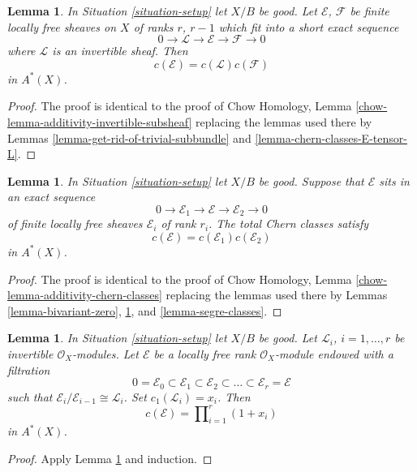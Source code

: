 \documentclass{stacks-project}
\theoremstyle{plain}
\newtheorem{lemma}[subsection]{Lemma}
\theoremstyle{definition}
\theoremstyle{remark}
\numberwithin{equation}{subsection}
\begin{document}
\begin{lemma}
\label{lemma-additivity-invertible-subsheaf}
In Situation \ref{situation-setup} let $X/B$ be good.
Let $\mathcal{E}$, $\mathcal{F}$ be finite locally free sheaves
on $X$ of ranks $r$, $r - 1$ which fit into a short
exact sequence
$$
0 \to \mathcal{L} \to \mathcal{E} \to \mathcal{F} \to 0
$$
where $\mathcal{L}$ is an invertible sheaf.
Then
$$
c(\mathcal{E}) = c(\mathcal{L}) c(\mathcal{F})
$$
in $A^*(X)$.
\end{lemma}

\begin{proof}
The proof is identical to the proof of
Chow Homology, Lemma \ref{chow-lemma-additivity-invertible-subsheaf}
replacing the lemmas used there by
Lemmas
\ref{lemma-get-rid-of-trivial-subbundle} and
\ref{lemma-chern-classes-E-tensor-L}.
\end{proof}

\begin{lemma}
\label{lemma-additivity-chern-classes}
In Situation \ref{situation-setup} let $X/B$ be good.
Suppose that $\mathcal{E}$ sits in an exact sequence
$$
0
\to
\mathcal{E}_1
\to
\mathcal{E}
\to
\mathcal{E}_2
\to
0
$$
of finite locally free sheaves $\mathcal{E}_i$ of rank $r_i$.
The total Chern classes satisfy
$$
c(\mathcal{E}) = c(\mathcal{E}_1) c(\mathcal{E}_2)
$$
in $A^*(X)$.
\end{lemma}

\begin{proof}
The proof is identical to the proof of
Chow Homology, Lemma \ref{chow-lemma-additivity-chern-classes}
replacing the lemmas used there by
Lemmas \ref{lemma-bivariant-zero},
\ref{lemma-additivity-invertible-subsheaf}, and
\ref{lemma-segre-classes}.
\end{proof}

\begin{lemma}
\label{lemma-chern-filter-by-linebundles}
In Situation \ref{situation-setup} let $X/B$ be good.
Let ${\mathcal L}_i$, $i = 1, \ldots, r$ be invertible
$\mathcal{O}_X$-modules.
Let $\mathcal{E}$ be a locally free rank
$\mathcal{O}_X$-module endowed with a filtration
$$
0 = \mathcal{E}_0 \subset \mathcal{E}_1 \subset \mathcal{E}_2
\subset \ldots \subset \mathcal{E}_r = \mathcal{E}
$$
such that $\mathcal{E}_i/\mathcal{E}_{i - 1} \cong \mathcal{L}_i$.
Set $c_1({\mathcal L}_i) = x_i$. Then
$$
c(\mathcal{E})
=
\prod\nolimits_{i = 1}^r (1 + x_i)
$$
in $A^*(X)$.
\end{lemma}

\begin{proof}
Apply Lemma \ref{lemma-additivity-invertible-subsheaf} and induction.
\end{proof}
\end{document}
